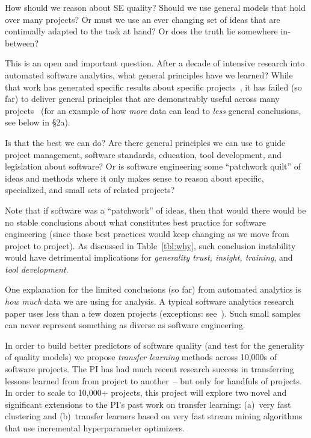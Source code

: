 


How should we reason about SE quality?  Should we use  general models that hold over many projects? Or must we use an ever changing set of ideas that are   continually adapted to the task at hand? 
Or does the truth lie somewhere in-between?  

This is an open and important question. After a decade of intensive research into automated software analytics,
what general principles have we learned?
While that work has generated   specific results about   specific projects~\cite{Bird:2015,menzies2013software},
it has failed (so far) to deliver general principles that are demonstrably useful across many projects~\cite{menzies2013guest} (for an example of how {\em more} data can lead to {\em less} general conclusions,
see below in {\S}2a).

Is that the best we can do? 
Are there general principles we can use to guide project management, software standards, education,   tool development, and legislation about software? 
Or is  software engineering some ``patchwork quilt'' of ideas and methods where it only makes sense to reason about
specific, specialized, and small sets of related projects? 

Note that if software was a ``patchwork'' of ideas,   then that would  there would be no stable conclusions about what constitutes best practice for software
engineering (since those best practices would keep changing as we move from project to project). 
As discussed in Table~\ref{tbl:why}, such conclusion instability
would have detrimental
implications for {\em generality trust, insight, training}, and {\em tool
          development}.
          
     
One  explanation for the limited conclusions (so far) from automated analytics is  {\em how much} data we are using for analysis. 
A  typical   software analytics research paper uses less
than a few dozen projects  (exceptions: see~\cite{krishna18a, zhao17, agrawal18}). Such small samples can never represent something as diverse as software engineering.

In order to build better predictors of software quality
(and test for the generality of quality models)
we propose  {\em transfer learning}
methods across 10,000s of software projects.
The PI has had much recent research success
in transferring lessons learned from from project to another~\cite{nam2018heterogeneous,krishna2016b, krishna16a, krishna2017less, krishna2017simpler, krishna2016bigse, krishna16, krishna2017learning}-- but only for  handfuls of projects. 
In order to scale to 10,000+ projects,   this project will explore two  novel and significant extensions to
the PI's past work on transfer learning:
(a)~very fast clustering and (b)~transfer
learners based 
on  
very fast stream mining  algorithms that use
incremental hyperparameter optimizers.

